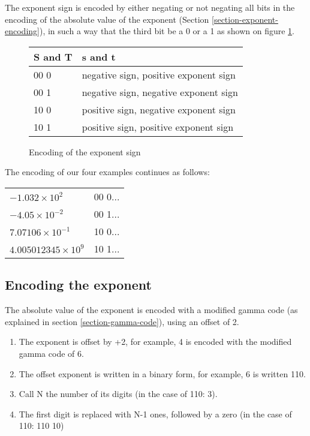 \documentclass{acm_proc_article-sp}
\begin{document}
The exponent sign is encoded by either negating or not negating all bits in the encoding of the absolute value of the exponent (Section \ref{section-exponent-encoding}), in such a way that the third bit be a 0 or a 1 as shown on figure \ref{figure-exponent-sign}.

\begin{figure}
\caption{Encoding of the exponent sign}
\label{figure-exponent-sign}
\center
\begin{tabular}{|l|l|}
\hline
S and T & s and t \\
\hline
00 0 &  negative sign, positive exponent sign\\
\hline
00 1 &  negative sign, negative exponent sign\\
\hline
10 0 & positive sign, negative exponent sign\\
\hline
10 1 & positive sign, positive exponent sign\\
\hline
\end{tabular}
\end{figure}

The encoding of our four examples continues as follows:

\begin{tabular}{l|l}
$- 1.032 \times 10^2$ & 00 0... \\

$-4.05 \times 10^{-2}$ & 00 1... \\

$7.07106 \times 10^{-1}$ & 10 0... \\

$4.005012345 \times 10^9$ & 10 1...\\
\end{tabular}

\subsection{Encoding the exponent}

The absolute value of the exponent is encoded with a modified gamma code (as explained in section \ref{section-gamma-code}), using an offset of 2.

\label{section-exponent-encoding}
\begin{enumerate}
\item The exponent is offset by +2, for example, 4 is encoded with the modified gamma code of 6. 
\item  The offset exponent is written in a binary form, for example, 6 is written 110.
\item  Call N the number of its digits (in the case of 110: 3).
\item  The first digit is replaced with N-1 ones, followed by a zero (in the case of 110: 110 10)
\end{enumerate}
\end{document}
